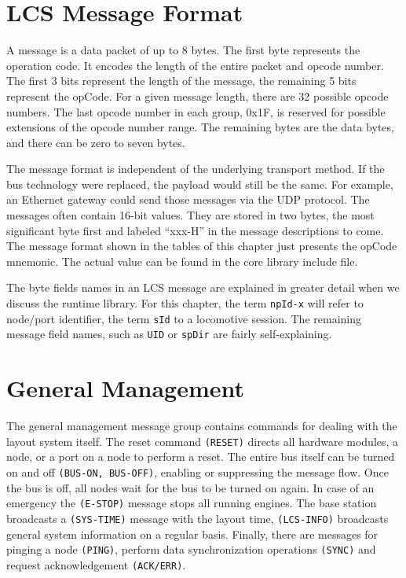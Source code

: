 \section{LCS Message Format}

A message is a data packet of up to 8 bytes. The first byte represents the operation code. It encodes the length of the entire packet and opcode number. The first 3 bits represent the length of the message, the remaining 5 bits represent the opCode. For a given message length, there are 32 possible opcode numbers. The last opcode number in each group, 0x1F, is reserved for possible extensions of the opcode number range. The remaining bytes are the data bytes, and there can be zero to seven bytes. 

The message format is independent of the underlying transport method. If the bus technology were replaced, the payload would still be the same. For example, an Ethernet gateway could send those messages via the UDP protocol. The messages often contain 16-bit values. They are stored in two bytes, the most significant byte first and labeled ``xxx-H'' in the message descriptions to come. The message format shown in the tables of this chapter just presents the opCode mnemonic. The actual value can be found in the core library include file.

The byte fields names in an LCS message are explained in greater detail when we discuss the runtime library. For this chapter, the term \texttt{npId-x} will refer to node/port identifier, the term \texttt{sId} to a locomotive session. The remaining message field names, such as \texttt{UID} or \texttt{spDir} are fairly self-explaining.

\section{General Management}

The general management message group contains commands for dealing with the layout system itself. The reset command \texttt{(RESET)} directs all hardware modules, a node, or a port on a node to perform a reset. The entire bus itself can be turned on and off \texttt{(BUS-ON, BUS-OFF)}, enabling or suppressing the message flow. Once the bus is off, all nodes wait for the bus to be turned on again. In case of an emergency the \texttt{(E-STOP)} message stops all running engines. The base station broadcasts a \texttt{(SYS-TIME)} message with the layout time, \texttt{(LCS-INFO)} broadcasts general system information on a regular basis. Finally, there are messages for pinging a node \texttt{(PING)}, perform data synchronization operations \texttt{(SYNC)} and request acknowledgement \texttt{(ACK/ERR)}.

